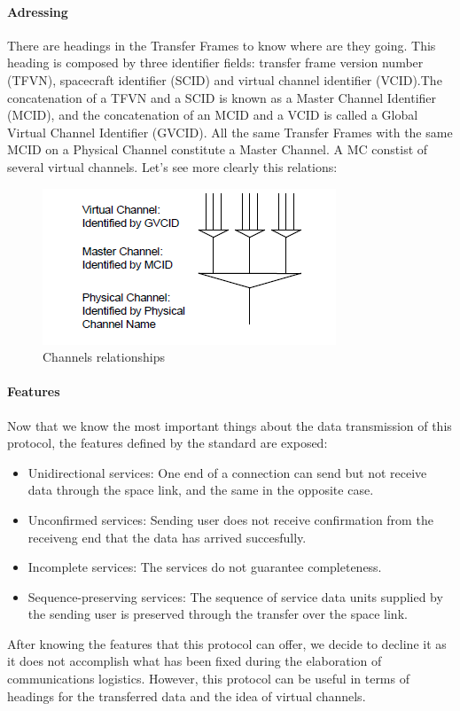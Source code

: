 \documentclass[12pt,a4paper]{report}
\begin{document}
\paragraph{Adressing}
There are headings in the Transfer Frames to know where are they going. This heading is composed by three identifier fields: transfer frame version number (TFVN), spacecraft identifier (SCID) and virtual channel identifier (VCID).The concatenation of a TFVN and a SCID is known as a Master Channel Identifier (MCID), and the concatenation of an MCID and a VCID is called a Global Virtual Channel Identifier (GVCID). All the same Transfer Frames with the same MCID on a Physical Channel constitute a Master Channel. A MC constist of several virtual channels. Let's see more clearly this relations: 
\begin{figure}[H]
\includegraphics[scale=1]{relationschannels.PNG} 
\centering
\caption{Channels relationships}
\end{figure}
\paragraph{Features}
Now that we know the most important things about the data transmission of this protocol, the features defined by the standard are exposed:
\begin{itemize}
\item Unidirectional services: One end of a connection can send but not receive data through the space link, and the same in the opposite case.
\item Unconfirmed services: Sending user does not receive confirmation from the receiveng end that the data has arrived succesfully.
\item Incomplete services: The services do not guarantee completeness.
\item Sequence-preserving services: The sequence of service data units supplied by the sending user is preserved through the transfer over the space link.
\end{itemize} 
After knowing the features that this protocol can offer, we decide to decline it as it does not accomplish what has been fixed during the elaboration of communications logistics. However, this protocol can be useful in terms of headings for the transferred data and the idea of virtual channels. 

\end{document}
